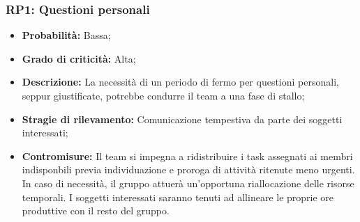 \subsubsection{RP1: Questioni personali}
\begin{itemize}
    \item \textbf{Probabilità:} Bassa;
    \item \textbf{Grado di criticità:} Alta;
    \item \textbf{Descrizione:} La necessità di un periodo di fermo per questioni personali, seppur giustificate, potrebbe condurre il team a una fase di stallo;
    \item \textbf{Stragie di rilevamento:} Comunicazione tempestiva da parte dei soggetti interessati;
    \item \textbf{Contromisure:} Il team si impegna a ridistribuire i task assegnati ai membri indisponbili previa individuazione e proroga di attività ritenute meno urgenti. In caso di necessità, il gruppo attuerà un'opportuna riallocazione delle risorse temporali. I soggetti interessati saranno tenuti ad allineare le proprie ore produttive con il resto del gruppo.
\end{itemize}